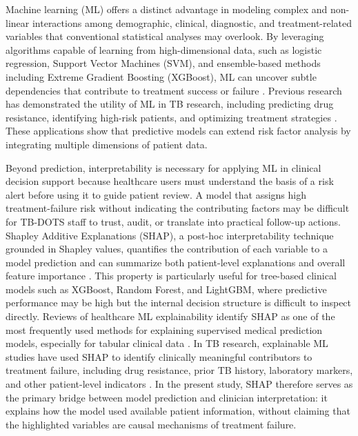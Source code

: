 \documentclass[12pt]{article}
\begin{document}
Machine learning (ML) offers a distinct advantage in modeling complex and non-linear interactions among demographic, clinical, diagnostic, and treatment-related variables that conventional statistical analyses may overlook. By leveraging algorithms capable of learning from high-dimensional data, such as logistic regression, Support Vector Machines (SVM), and ensemble-based methods including Extreme Gradient Boosting (XGBoost), ML can uncover subtle dependencies that contribute to treatment success or failure \citep{ref16}. Previous research has demonstrated the utility of ML in TB research, including predicting drug resistance, identifying high-risk patients, and optimizing treatment strategies \citep{ref26, ref27}. These applications show that predictive models can extend risk factor analysis by integrating multiple dimensions of patient data.

Beyond prediction, interpretability is necessary for applying ML in clinical decision support because healthcare users must understand the basis of a risk alert before using it to guide patient review. A model that assigns high treatment-failure risk without indicating the contributing factors may be difficult for TB-DOTS staff to trust, audit, or translate into practical follow-up actions. Shapley Additive Explanations (SHAP), a post-hoc interpretability technique grounded in Shapley values, quantifies the contribution of each variable to a model prediction and can summarize both patient-level explanations and overall feature importance \citep{lundberg2017unified,lundberg2020local}. This property is particularly useful for tree-based clinical models such as XGBoost, Random Forest, and LightGBM, where predictive performance may be high but the internal decision structure is difficult to inspect directly. Reviews of healthcare ML explainability identify SHAP as one of the most frequently used methods for explaining supervised medical prediction models, especially for tabular clinical data \citep{allgaier2023model}. In TB research, explainable ML studies have used SHAP to identify clinically meaningful contributors to treatment failure, including drug resistance, prior TB history, laboratory markers, and other patient-level indicators \citep{ref15,wang2025biochemical,sibanda2026explainable}. In the present study, SHAP therefore serves as the primary bridge between model prediction and clinician interpretation: it explains how the model used available patient information, without claiming that the highlighted variables are causal mechanisms of treatment failure.
\end{document}
